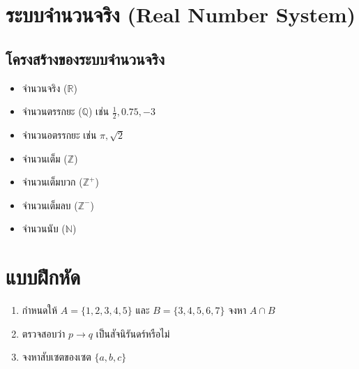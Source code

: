 \documentclass[a4paper,12pt]{article}
\begin{document}
\section{ระบบจำนวนจริง (Real Number System)}
\subsection{โครงสร้างของระบบจำนวนจริง}
\begin{itemize}
    \item จำนวนจริง ($\mathbb{R}$) 
    \item จำนวนตรรกยะ ($\mathbb{Q}$) เช่น $\frac{1}{2}, 0.75, -3$
    \item จำนวนอตรรกยะ เช่น $\pi, \sqrt{2}$
    \item จำนวนเต็ม ($\mathbb{Z}$)
    \item จำนวนเต็มบวก ($\mathbb{Z}^+$)
    \item จำนวนเต็มลบ ($\mathbb{Z}^-$)
    \item จำนวนนับ ($\mathbb{N}$)
\end{itemize}

\section{แบบฝึกหัด}
\begin{enumerate}
    \item กำหนดให้ $A = \{1,2,3,4,5\}$ และ $B = \{3,4,5,6,7\}$ จงหา $A \cap B$
    \item ตรวจสอบว่า $p \rightarrow q$ เป็นสัจนิรันดร์หรือไม่
    \item จงหาสับเซตของเซต $\{a,b,c\}$
\end{enumerate}
\end{document}
